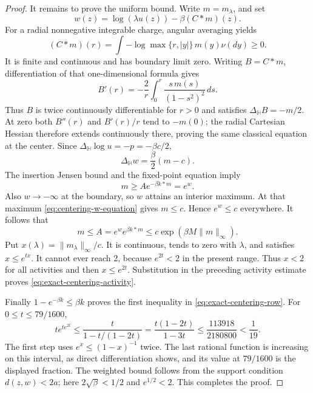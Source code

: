 \documentclass[11pt]{article}
\theoremstyle{remark}\newtheorem{remark}[theorem]{Remark}
\begin{document}
\begin{proof}
It remains to prove the uniform bound.  Write $m=m_\lambda$, and set
\[
 w(z)=\log(\lambda u(z))-\beta(C*m)(z).
\]
For a radial nonnegative integrable charge, angular averaging yields
\[
 (C*m)(r)=\int-\log\max\{r,|y|\}\,m(y)\nu(dy)\ge0.
\]
It is finite and continuous and has boundary limit zero.  Writing
$B=C*m$, differentiation of that one-dimensional formula gives
\[
 B'(r)=-\frac2r\int_0^r\frac{s\,m(s)}{(1-s^2)^2}\,ds.
\]
Thus $B$ is twice continuously differentiable for $r>0$ and satisfies
$\Delta_{\mathbb H}B=-m/2$.  At zero both $B''(r)$ and $B'(r)/r$
tend to $-m(0)$; the radial Cartesian Hessian therefore extends
continuously there, proving the same classical equation at the center.
Since $\Delta_{\mathbb H}\log u=-p=-\beta c/2$,
\begin{equation}\label{eq:centering-w-equation}
 \Delta_{\mathbb H}w=\frac\beta2(m-c).
\end{equation}
The insertion Jensen bound and the fixed-point equation imply
\[
 m\ge A e^{-\beta k*m}=e^w.
\]
Also $w\to-\infty$ at the boundary, so $w$ attains an interior
maximum.  At that maximum \eqref{eq:centering-w-equation} gives
$m\le c$.  Hence $e^w\le c$ everywhere.  It follows that
\[
 m\le A=e^w e^{\beta k*m}
       \le c\exp(\beta M\|m\|_\infty).
\]
Put $x(\lambda)=\|m_\lambda\|_\infty/c$.  It is continuous,
tends to zero with $\lambda$, and satisfies $x\le e^{tx}$.
It cannot ever reach $2$, because $e^{2t}<2$ in the present range.
Thus $x<2$ for all activities and then $x\le e^{2t}$.  Substitution
in the preceding activity estimate proves
\eqref{eq:exact-centering-activity}.

Finally $1-e^{-\beta k}\le\beta k$ proves the first inequality in
\eqref{eq:exact-centering-row}.  For $0\le t\le79/1600$,
\[
 t e^{t e^{2t}}
 \le\frac{t}{1-t/(1-2t)}
 =\frac{t(1-2t)}{1-3t}
 \le\frac{113918}{2180800}<\frac1{19}.
\]
The first step uses $e^x\le(1-x)^{-1}$ twice.  The last rational
function is increasing on this interval, as direct differentiation
shows, and its value at $79/1600$ is the displayed fraction.
The weighted bound follows from the support condition $d(z,w)<2a$;
here $2\sqrt\beta<1/2$ and $e^{1/2}<2$.
This completes the proof.
\end{proof}
\end{document}
